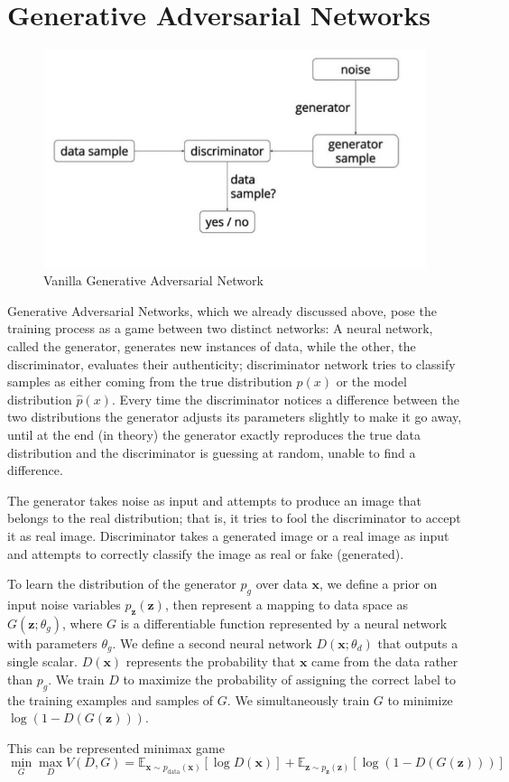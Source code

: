 \section{Generative Adversarial Networks} %
\label{sec:generative_adversarial_networks}
\begin{figure}[H]
\centering\includegraphics[width=.7\textwidth]{images/vanillaGAN.jpg}
\caption{Vanilla Generative Adversarial Network}
\label{fig:gans}
\end{figure}
Generative Adversarial Networks, which we already discussed above, pose the training process as a game between two distinct networks: A neural network, called the generator, generates new instances of data, while the other, the discriminator, evaluates their authenticity; discriminator network tries to classify samples as either coming from the true distribution $p(x)$ or the model distribution $\hat{p}(x)$. Every time the discriminator notices a difference between the two distributions the generator adjusts its parameters slightly to make it go away, until at the end (in theory) the generator exactly reproduces the true data distribution and the discriminator is guessing at random, unable to find a difference.\par\bigskip
The generator takes noise as input and attempts to produce an image that belongs to the real distribution; that is, it tries to fool the discriminator to accept it as real image. Discriminator takes a generated image or a real image as input and attempts to correctly classify the image as real or fake (generated).\par\bigskip
To learn the distribution of the generator $p_g$ over data $\bm{x}$, we define a prior on input noise variables $p_{\bm{z}}(\bm{z})$, then represent a mapping to data space as $G(\bm{z}; \theta_g)$, where $G$ is a differentiable function represented by a neural network with parameters $\theta_g$. We define a second neural network $D(\bm{x}; \theta_d)$ that outputs a single scalar. $D(\bm{x})$ represents the probability that $\bm{x}$ came from the data rather than $p_g$. We train $D$ to maximize the probability of assigning the correct label to the training examples and samples of $G$. We simultaneously train $G$ to minimize $\log(1-D(G(\bm{z})))$.\par\bigskip
\noindent This can be represented minimax game \\
\begin{equation} \label{eu_eqn}
\min_{G} \max_{D} V(D, G)=\mathbb{E}_{\bm{x} \sim p_{\text{data}}(\bm{x})}[\log D(\bm{x})]+\mathbb{E}_{\bm{z} \sim p_{\bm{z}}(\bm{z})}[\log (1 - D(G(\bm{z})))]
\end{equation}

